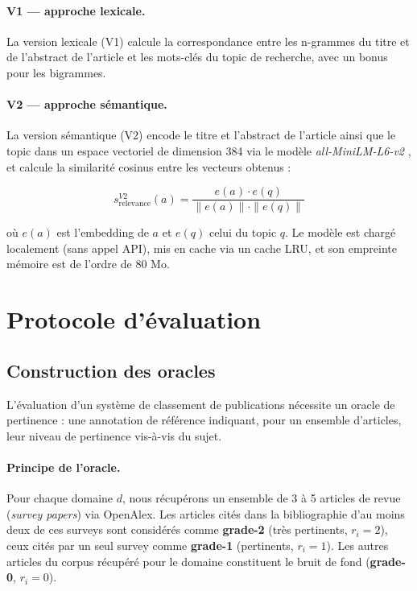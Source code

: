 \paragraph{V1 — approche lexicale.}
La version lexicale (V1) calcule la correspondance entre les n-grammes
du titre et de l'abstract de l'article et les mots-clés du topic de
recherche, avec un bonus pour les bigrammes.

\paragraph{V2 — approche sémantique.}
La version sémantique (V2) encode le titre et l'abstract de l'article
ainsi que le topic dans un espace vectoriel de dimension 384 via
le modèle \textit{all-MiniLM-L6-v2} \cite{wang2020minilm}, et calcule
la similarité cosinus entre les vecteurs obtenus :

\begin{equation}
  s_{\text{relevance}}^{V2}(a) = \frac{e(a) \cdot e(q)}{\|e(a)\| \cdot \|e(q)\|}
  \label{eq:relevance_v2}
\end{equation}

où $e(a)$ est l'embedding de $a$ et $e(q)$ celui du topic $q$.
Le modèle est chargé localement (sans appel API), mis en cache via
un cache LRU, et son empreinte mémoire est de l'ordre de 80 Mo.

\section{Protocole d'évaluation}

\subsection{Construction des oracles}
\label{sec:oracle_construction}

L'évaluation d'un système de classement de publications nécessite un
oracle de pertinence : une annotation de référence indiquant, pour un
ensemble d'articles, leur niveau de pertinence vis-à-vis du sujet.

\paragraph{Principe de l'oracle.}
Pour chaque domaine $d$, nous récupérons un ensemble de 3 à 5 articles
de revue (\textit{survey papers}) via OpenAlex. Les articles cités dans
la bibliographie d'au moins deux de ces surveys sont considérés comme
\textbf{grade-2} (très pertinents, $r_i = 2$), ceux cités par un seul
survey comme \textbf{grade-1} (pertinents, $r_i = 1$). Les autres articles
du corpus récupéré pour le domaine constituent le bruit de fond
(\textbf{grade-0}, $r_i = 0$).

